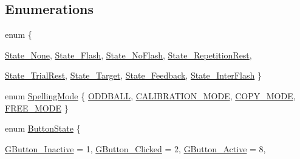 \subsection*{Enumerations}
\begin{DoxyCompactItemize}
\item 
enum \{ \par
\hyperlink{namespaceOpenViBEApplications_a4f67e167881500fa273c411eed60c12aabfee80105dd303f06a0653ddbb221df3}{State\_\-None}, 
\hyperlink{namespaceOpenViBEApplications_a4f67e167881500fa273c411eed60c12aa365445de0f0ad1b2570efd277179c442}{State\_\-Flash}, 
\hyperlink{namespaceOpenViBEApplications_a4f67e167881500fa273c411eed60c12aab45e0048c57f2dafd493ca72976d49be}{State\_\-NoFlash}, 
\hyperlink{namespaceOpenViBEApplications_a4f67e167881500fa273c411eed60c12aa51a6a443a980b1fedf66be85faadc1bb}{State\_\-RepetitionRest}, 
\par
\hyperlink{namespaceOpenViBEApplications_a4f67e167881500fa273c411eed60c12aa77ee8550a01e727b2c88563672c031bc}{State\_\-TrialRest}, 
\hyperlink{namespaceOpenViBEApplications_a4f67e167881500fa273c411eed60c12aae0b2d40058d3f17b55714af80fcd89cd}{State\_\-Target}, 
\hyperlink{namespaceOpenViBEApplications_a4f67e167881500fa273c411eed60c12aa39077b0e2a7b43c052fe1189c314f117}{State\_\-Feedback}, 
\hyperlink{namespaceOpenViBEApplications_a4f67e167881500fa273c411eed60c12aa00b28257cf48cb3b38a3949e4b9076ef}{State\_\-InterFlash}
 \}
\item 
enum \hyperlink{namespaceOpenViBEApplications_ab6ab87a925d53afcb139f384cbf23f39}{SpellingMode} \{ \hyperlink{namespaceOpenViBEApplications_ab6ab87a925d53afcb139f384cbf23f39a2de1faf4058a062f117456789328534b}{ODDBALL}, 
\hyperlink{namespaceOpenViBEApplications_ab6ab87a925d53afcb139f384cbf23f39a09c26ab4e4ecdd92f0fc5c1719cc8b71}{CALIBRATION\_\-MODE}, 
\hyperlink{namespaceOpenViBEApplications_ab6ab87a925d53afcb139f384cbf23f39a7ed2ce256bd5fefed105a361ff5e24ed}{COPY\_\-MODE}, 
\hyperlink{namespaceOpenViBEApplications_ab6ab87a925d53afcb139f384cbf23f39a0541cdf3fab6bffd1f4ac33622c58c3d}{FREE\_\-MODE}
 \}
\item 
enum \hyperlink{namespaceOpenViBEApplications_a4b71ded51609d9643a2256d0479f0bd4}{ButtonState} \{ \par
\hyperlink{namespaceOpenViBEApplications_a4b71ded51609d9643a2256d0479f0bd4a81279923cbb21a6011df6ab5386f8c14}{GButton\_\-Inactive} =  1, 
\hyperlink{namespaceOpenViBEApplications_a4b71ded51609d9643a2256d0479f0bd4acd810fea55677d5cbb3c8a734b91b0c9}{GButton\_\-Clicked} =  2, 
\hyperlink{namespaceOpenViBEApplications_a4b71ded51609d9643a2256d0479f0bd4a5c91aba1ad3d4a2f7e35d0de2bd25043}{GButton\_\-Active} =  8, 

\end{DoxyCompactItemize}
